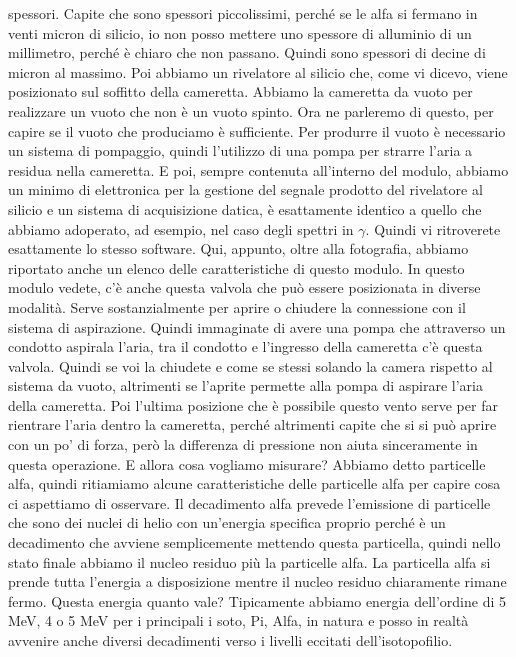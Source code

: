 spessori. Capite che sono spessori piccolissimi, perché se le alfa si fermano in venti micron di silicio, io non posso mettere uno spessore di alluminio di un millimetro, perché è chiaro che non passano. Quindi sono spessori di decine di micron al massimo. Poi abbiamo un rivelatore al silicio che, come vi dicevo, viene posizionato sul soffitto della cameretta. Abbiamo la cameretta da vuoto per realizzare un vuoto che non è un vuoto spinto. Ora ne parleremo di questo, per capire se il vuoto che produciamo è sufficiente. Per produrre il vuoto è necessario un sistema di pompaggio, quindi l'utilizzo di una pompa per strarre l'aria a residua nella cameretta. E poi, sempre contenuta all'interno del modulo, abbiamo un minimo di elettronica per la gestione del segnale prodotto del rivelatore al silicio e un sistema di acquisizione datica, è esattamente identico a quello che abbiamo adoperato, ad esempio, nel caso degli spettri in $\gamma$. Quindi vi ritroverete esattamente lo stesso software. Qui, appunto, oltre alla fotografia, abbiamo riportato anche un elenco delle caratteristiche di questo modulo. In questo modulo vedete, c'è anche questa valvola che può essere posizionata in diverse modalità. Serve sostanzialmente per aprire o chiudere la connessione con il sistema di aspirazione. Quindi immaginate di avere una pompa che attraverso un condotto aspirala l'aria, tra il condotto e l'ingresso della cameretta c'è questa valvola. Quindi se voi la chiudete e come se stessi solando la camera rispetto al sistema da vuoto, altrimenti se l'aprite permette alla pompa di aspirare l'aria della cameretta. Poi l'ultima posizione che è possibile questo vento serve per far rientrare l'aria dentro la cameretta, perché altrimenti capite che si si può aprire con un po' di forza, però la differenza di pressione non aiuta sinceramente in questa operazione. E allora cosa vogliamo misurare? Abbiamo detto particelle alfa, quindi ritiamiamo alcune caratteristiche delle particelle alfa per capire cosa ci aspettiamo di osservare. Il decadimento alfa prevede l'emissione di particelle che sono dei nuclei di helio con un'energia specifica proprio perché è un decadimento che avviene semplicemente mettendo questa particella, quindi nello stato finale abbiamo il nucleo residuo più la particelle alfa. La particella alfa si prende tutta l'energia a disposizione mentre il nucleo residuo chiaramente rimane fermo. Questa energia quanto vale? Tipicamente abbiamo energia dell'ordine di 5 MeV, 4 o 5 MeV per i principali i soto, Pi, Alfa, in natura e posso in realtà avvenire anche diversi decadimenti verso i livelli eccitati dell'isotopofilio. 

